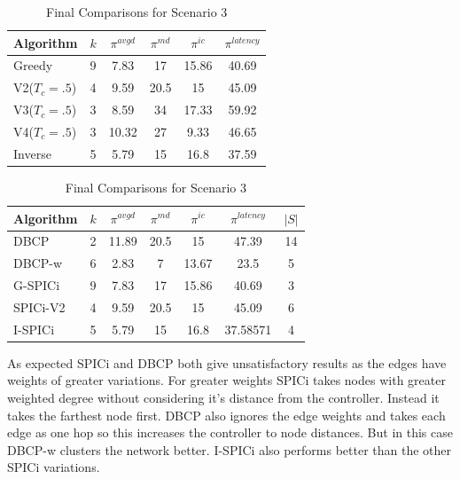 \documentclass[8pt]{extarticle}
\begin{document}
	\begin{table}
		\caption{SPICi variations for Scenario 3}
		\begin{center}
			\begin{tabular}{|l|c|c|c|c|c|}
				\hline
				\textbf{Algorithm} & \textbf{$k$} & $\pi^{avgd}$ & \textbf{$\pi^{md}$} & \textbf{$\pi^{ic}$} & \textbf{$\pi^{latency}$} \\
				\hline
				Greedy & 9 & 7.83 & 17 & 15.86 & 40.69 \\
				V2($T_c=.5$) & 4 & 9.59 & 20.5 & 15 & 45.09 \\
				V3($T_c=.5$) & 3 & 8.59 & 34 & 17.33 & 59.92 \\
				V4($T_c=.5$) & 3 & 10.32 & 27 & 9.33 & 46.65 \\
				Inverse & 5 & 5.79 & 15 & 16.8 & 37.59 \\
				\hline
			\end{tabular}
		\end{center}
		\caption{Final Comparisons for Scenario 3}
		\begin{center}
			\begin{tabular}{|l|c|c|c|c|c|c|}
				\hline
				\textbf{Algorithm} & \textbf{$k$} & $\pi^{avgd}$ & \textbf{$\pi^{md}$} & \textbf{$\pi^{ic}$} & \textbf{$\pi^{latency}$} & \textbf{$|S|$} \\
				\hline
				DBCP & 2 & 11.89 & 20.5 & 15 & 47.39 & 14 \\
				DBCP-w & 6 & 2.83 & 7 & 13.67 & 23.5 & 5 \\
				G-SPICi & 9 & 7.83 & 17 & 15.86 & 40.69 & 3 \\
				SPICi-V2 & 4 & 9.59 & 20.5 & 15 & 45.09 & 6 \\
				I-SPICi & 5 & 5.79 & 15 & 16.8 & 37.58571 & 4 \\
				\hline
			\end{tabular}
		\end{center}
	\end{table}
	
	As expected SPICi and DBCP both give unsatisfactory results as the edges have weights of greater variations. For greater weights SPICi takes nodes with greater weighted degree without considering it's distance from the controller. Instead it takes the farthest node first. DBCP also ignores the edge weights and takes each edge as one hop so this increases the controller to node distances. But in this case DBCP-w clusters the network better. I-SPICi also performs better than the other SPICi variations.
\end{document}
